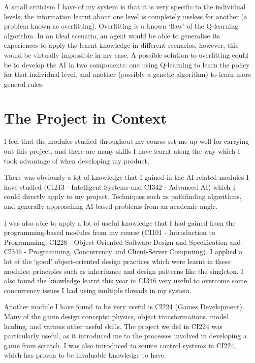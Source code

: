 \documentclass[a4paper,oneside]{report}
\begin{document}
A small criticism I have of my system is that it is very specific to the individual levels; the information learnt about one level is completely useless for another (a problem known as overfitting). Overfitting is a known `flaw' of the Q-learning algorithm. In an ideal scenario, an agent would be able to generalise its experiences to apply the learnt knowledge in different scenarios, however, this would be virtually impossible in my case. A possible solution to overfitting could be to develop the AI in two components: one using Q-learning to learn the policy for that individual level, and another (possibly a genetic algorithm) to learn more general rules. 

\section{The Project in Context}
	
I feel that the modules studied throughout my course set me up well for carrying out this project, and there are many skills I have learnt along the way which I took advantage of when developing my product.

There was obviously a lot of knowledge that I gained in the AI-related modules I have studied (CI213 - Intelligent Systems and CI342 - Advanced AI) which I could directly apply to my project. Techniques such as pathfinding algorithms, and generally approaching AI-based problems from an academic angle.

I was also able to apply a lot of useful knowledge that I had gained from the programming-based modules from my course (CI101 - Introduction to Programming, CI228 - Object-Oriented Software Design and Specification and CI346 - Programming, Concurrency and Client-Server Computing). I applied a lot of the `good' object-oriented design practices which were learnt in these modules: principles such as inheritance and design patterns like the singleton. I also found the knowledge learnt this year in CI346 very useful to overcome some concurrency issues I had using multiple threads in my system.

Another module I have found to be very useful is CI224 (Games Development). Many of the game design concepts: physics, object transformations, model loading, and various other useful skills. The project we did in CI224 was particularly useful, as it introduced me to the processes involved in developing a game from scratch. I was also introduced to source control systems in CI224, which has proven to be invaluable knowledge to have.
\end{document}
